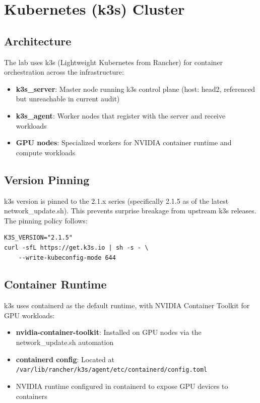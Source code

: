 \section{Kubernetes (k3s) Cluster}

\subsection{Architecture}

The lab uses k3s (Lightweight Kubernetes from Rancher) for container orchestration across the infrastructure:

\begin{itemize}
    \item \textbf{k3s\_server}: Master node running k3s control plane (host: head2, referenced but unreachable in current audit)
    
    \item \textbf{k3s\_agent}: Worker nodes that register with the server and receive workloads
    
    \item \textbf{GPU nodes}: Specialized workers for NVIDIA container runtime and compute workloads
\end{itemize}

\subsection{Version Pinning}

k3s version is pinned to the 2.1.x series (specifically 2.1.5 as of the latest network\_update.sh). This prevents surprise breakage from upstream k3s releases. The pinning policy follows:
\begin{lstlisting}[style=mystyle]
K3S_VERSION="2.1.5"
curl -sfL https://get.k3s.io | sh -s - \
    --write-kubeconfig-mode 644
    \end{lstlisting}

\subsection{Container Runtime}

k3s uses containerd as the default runtime, with NVIDIA Container Toolkit for GPU workloads:
\begin{itemize}
    \item \textbf{nvidia-container-toolkit}: Installed on GPU nodes via the network\_update.sh automation
    
    \item \textbf{containerd config}: Located at \texttt{/var/lib/rancher/k3s/agent/etc/containerd/config.toml}
    
    \item NVIDIA runtime configured in containerd to expose GPU devices to containers
\end{itemize}

